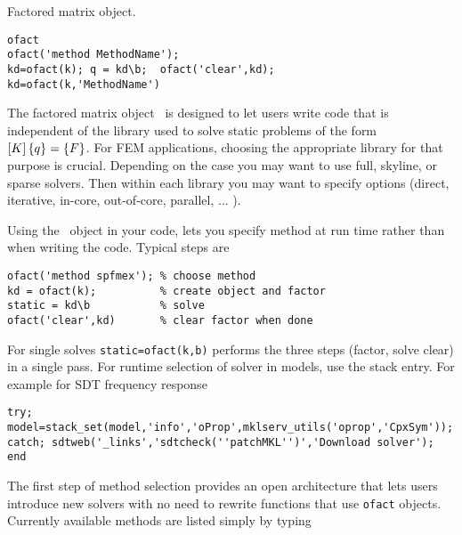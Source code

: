 

 Factored matrix object.


\begin{verbatim}
ofact
ofact('method MethodName');
kd=ofact(k); q = kd\b;  ofact('clear',kd);
kd=ofact(k,'MethodName')
\end{verbatim}


The factored matrix object \ofact\ is designed to let users write code that is independent of the library used to solve static problems of
the form $\left[K\right]\left\{q\right\}=\left\{F\right\}$.  For FEM applications, choosing the appropriate library for that purpose is crucial. Depending on the case
you may want to use full, skyline, or sparse solvers. Then within each library you may want to specify options (direct, iterative, in-core, out-of-core, parallel, ... ).

Using the \ofact\ object in your code, lets you specify method at run time rather than when writing the code. Typical steps are

\begin{verbatim}
ofact('method spfmex'); % choose method
kd = ofact(k);          % create object and factor
static = kd\b           % solve
ofact('clear',kd)       % clear factor when done
\end{verbatim}

For single solves {\tt static=ofact(k,b)} performs the three steps (factor, solve clear) in a single pass. For runtime selection of solver in models, use the  stack entry. For example for SDT frequency response

\begin{verbatim}
try; model=stack_set(model,'info','oProp',mklserv_utils('oprop','CpxSym'));
catch; sdtweb('_links','sdtcheck(''patchMKL'')','Download solver');
end
\end{verbatim}


The first step of method selection provides an open architecture that lets users introduce new solvers with no need to rewrite functions that use {\tt ofact} objects. Currently available methods are listed simply by typing 

